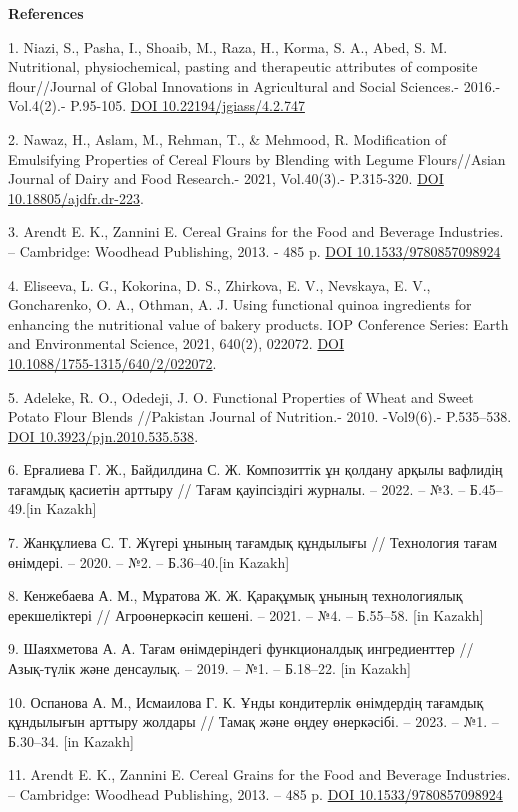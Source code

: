 \begin{center}
{\bfseries References}
\end{center}

\begin{references}
1. Niazi, S., Pasha, I., Shoaib, M., Raza, H., Korma, S. A., Abed, S. M.
Nutritional, physiochemical, pasting and therapeutic attributes of
composite flour//Journal of Global Innovations in Agricultural and
Social Sciences.- 2016.-Vol.4(2).- P.95-105.
\href{https://doi.org/10.22194/jgiass/4.2.747}{DOI
10.22194/jgiass/4.2.747}

2. Nawaz, H., Aslam, M., Rehman, T., \& Mehmood, R. Modification of
Emulsifying Properties of Cereal Flours by Blending with Legume
Flours//Asian Journal of Dairy and Food Research.- 2021, Vol.40(3).-
P.315-320. \href{https://doi.org/10.18805/ajdfr.dr-223}{DOI
10.18805/ajdfr.dr-223}.

3. Arendt E. K., Zannini E. Cereal Grains for the Food and Beverage
Industries. -- Cambridge: Woodhead Publishing, 2013. - 485 p.
\href{https://doi.org/10.1533/9780857098924}{DOI 10.1533/9780857098924}

4. Eliseeva, L. G., Kokorina, D. S., Zhirkova, E. V., Nevskaya, E. V.,
Goncharenko, O. A., Othman, A. J. Using functional quinoa ingredients
for enhancing the nutritional value of bakery products. IOP Conference
Series: Earth and Environmental Science, 2021, 640(2), 022072.
\href{https://doi.org/10.1088/1755-1315/640/2/022072}{DOI\\
10.1088/1755-1315/640/2/022072}.

5. Adeleke, R. O., Odedeji, J. O. Functional Properties of Wheat and
Sweet Potato Flour Blends //Pakistan Journal of Nutrition.-
2010. -Vol9(6).- P.535--538.
\href{https://doi.org/10.3923/pjn.2010.535.538}{DOI
10.3923/pjn.2010.535.538}.

6. Ерғалиева Г. Ж., Байдилдина С. Ж. Композиттік ұн қолдану арқылы
вафлидің тағамдық қасиетін арттыру // Тағам қауіпсіздігі журналы. --
2022. -- №3. -- Б.45--49.{[}in Kazakh{]}

7. Жанқұлиева С. Т. Жүгері ұнының тағамдық құндылығы // Технология тағам
өнімдері. -- 2020. -- №2. -- Б.36--40.{[}in Kazakh{]}

8. Кенжебаева А. М., Мұратова Ж. Ж. Қарақұмық ұнының технологиялық
ерекшеліктері // Агроөнеркәсіп кешені. -- 2021. -- №4. -- Б.55--58.
{[}in Kazakh{]}

9. Шаяхметова А. А. Тағам өнімдеріндегі функционалдық ингредиенттер //
Азық-түлік және денсаулық. -- 2019. -- №1. -- Б.18--22. {[}in Kazakh{]}

10. Оспанова А. М., Исмаилова Г. К. Ұнды кондитерлік өнімдердің тағамдық
құндылығын арттыру жолдары // Тамақ және өңдеу өнеркәсібі. -- 2023. --
№1. -- Б.30--34. {[}in Kazakh{]}

11. Arendt E. K., Zannini E. Cereal Grains for the Food and Beverage
Industries. -- Cambridge: Woodhead Publishing, 2013. -- 485 p.
\href{https://doi.org/10.1533/9780857098924}{DOI 10.1533/9780857098924}
\end{references}

